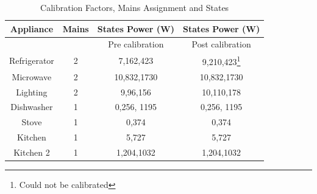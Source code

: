 \documentclass[conference]{IEEEtran}
\begin{document}
\begin{table}
\caption{Calibration Factors, Mains Assignment and States}
\label{tab:calibration_factors}
\begin{tabular}{|c|c|c|c|}
\hline
Appliance & Mains & States Power (W)& States Power (W)\\
\hline
&&Pre calibration&Post calibration\\
\hline
Refrigerator & 2& 7,162,423 & 9,210,423\footnote{Could not be calibrated}\\
Microwave &2& 10,832,1730& 10,832,1730\\
Lighting & 2& 9,96,156&10,110,178\\
Dishwasher & 1& 0,256, 1195 & 0,256, 1195\\
Stove& 1 & 0,374& 0,374\\
Kitchen & 1& 5,727&5,727\\
Kitchen 2&1 & 1,204,1032&1,204,1032 \\
%
%
\hline
%
\end{tabular}
\end{table}
\end{document}
